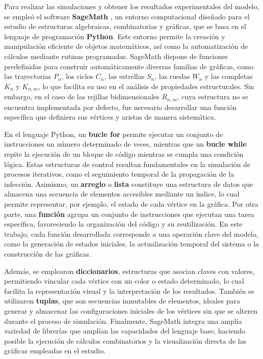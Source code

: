 \documentclass[12pt,titlepage,twoside,openright]{book}
\begin{document}
Para realizar las simulaciones y obtener los resultados experimentales del modelo, se emple\'o el software \textbf{SageMath} \cite{Matthes}, un entorno computacional dise\~nado para el estudio de estructuras algebraicas, combinatorias y gr\'aficas, que se basa en el lenguaje de programaci\'on \textbf{Python}. Este entorno permite la creaci\'on y manipulaci\'on eficiente de objetos matem\'aticos, as\'i como la automatizaci\'on de c\'alculos mediante rutinas programadas. SageMath dispone de funciones predefinidas para construir autom\'aticamente diversas familias de gr\'aficas, como las trayectorias $P_n$, los ciclos $C_n$, las estrellas $S_n$, las ruedas $W_n$ y las completas $K_n$ y $K_{n,m}$, lo que facilita su uso en el an\'alisis de propiedades estructurales. Sin embargo, en el caso de las rejillas bidimensionales $R_{n,m}$, cuya estructura no se encuentra implementada por defecto, fue necesario desarrollar una funci\'on espec\'ifica que definiera sus v\'ertices y aristas de manera sistem\'atica.

En el lenguaje Python, un \textbf{bucle for} permite ejecutar un conjunto de instrucciones un n\'umero determinado de veces, mientras que un \textbf{bucle while} repite la ejecuci\'on de un bloque de c\'odigo mientras se cumpla una condici\'on l\'ogica. Estas estructuras de control resultan fundamentales en la simulaci\'on de procesos iterativos, como el seguimiento temporal de la propagaci\'on de la infecci\'on. Asimismo, un \textbf{arreglo} o \textbf{lista} constituye una estructura de datos que almacena una secuencia de elementos accesibles mediante un \'indice, lo cual permite representar, por ejemplo, el estado de cada v\'ertice en la gr\'afica. Por otra parte, una \textbf{funci\'on} agrupa un conjunto de instrucciones que ejecutan una tarea espec\'ifica, favoreciendo la organizaci\'on del c\'odigo y su reutilizaci\'on. En este trabajo, cada funci\'on desarrollada corresponde a una operaci\'on clave del modelo, como la generaci\'on de estados iniciales, la actualizaci\'on temporal del sistema o la construcci\'on de las gr\'aficas.

Adem\'as, se emplearon \textbf{diccionarios}, estructuras que asocian claves con valores, permitiendo vincular cada v\'ertice con un color o estado determinado, lo cual facilita la representaci\'on visual y la interpretaci\'on de los resultados. Tambi\'en se utilizaron \textbf{tuplas}, que son secuencias inmutables de elementos, ideales para generar y almacenar las configuraciones iniciales de los v\'ertices sin que se alteren durante el proceso de simulaci\'on. Finalmente, SageMath integra una amplia variedad de librer\'ias que ampl\'ian las capacidades del lenguaje base, haciendo posible la ejecuci\'on de c\'alculos combinatorios y la visualizaci\'on directa de las gr\'aficas empleadas en el estudio.
\end{document}
